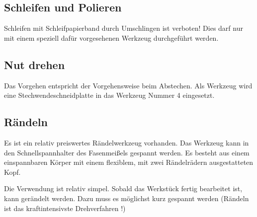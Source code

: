 \documentclass{\basedir/fablab-document}
\begin{document}
\subsection{Schleifen und Polieren}
Schleifen mit Schleifpapierband durch Umschlingen ist verboten! Dies darf nur mit einem speziell dafür vorgesehenen Werkzeug durchgeführt werden.

\subsection{Nut drehen}

Das Vorgehen entspricht der Vorgehensweise beim Abstechen. Als Werkzeug wird eine Stechwendeschneidplatte in das Werkzeug Nummer 4 eingesetzt. 


\subsection{Rändeln}
\label{handdrehen:raendeln}
Es ist ein relativ preiswertes Rändelwerkzeug vorhanden.
Das Werkzeug kann in den Schnellspannhalter des Fasenmeißels gespannt werden.
Es besteht aus einem einspannbaren Körper mit einem flexiblem, mit zwei Rändelrädern ausgestatteten Kopf.

Die Verwendung ist relativ simpel.
Sobald das Werkstück fertig bearbeitet ist, kann gerändelt werden.
Dazu muss es möglichst kurz gespannt werden (Rändeln ist das kraftintensivste Drehverfahren !)
\end{document}
